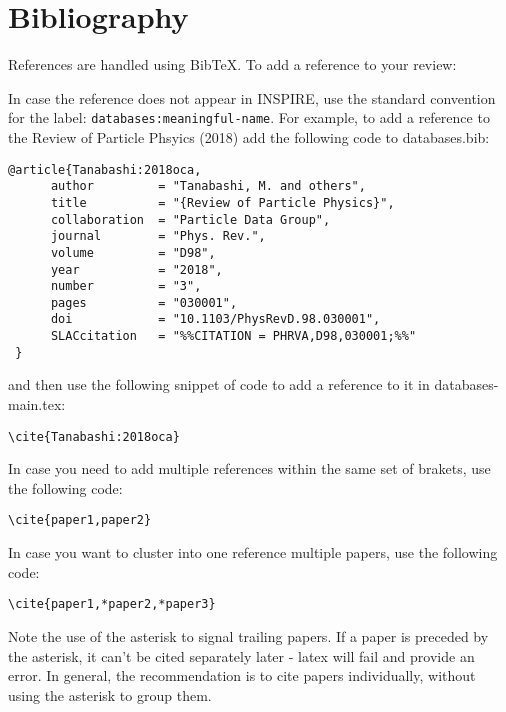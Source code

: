 \section{Bibliography}

References are handled using BibTeX. To add a reference to your review:
In case the reference does not appear in INSPIRE, use the standard convention for the label: {\tt databases:meaningful-name}.
For example, to add a reference to the Review of Particle Phsyics (2018) 
add the following code to databases.bib:
\begin{verbatim}
@article{Tanabashi:2018oca,
      author         = "Tanabashi, M. and others",
      title          = "{Review of Particle Physics}",
      collaboration  = "Particle Data Group",
      journal        = "Phys. Rev.",
      volume         = "D98",
      year           = "2018",
      number         = "3",
      pages          = "030001",
      doi            = "10.1103/PhysRevD.98.030001",
      SLACcitation   = "%%CITATION = PHRVA,D98,030001;%%"
 }
\end{verbatim}
and then use the following snippet of code to add a reference to it in databases-main.tex:
\begin{verbatim}
\cite{Tanabashi:2018oca}
\end{verbatim}
In case you need to add multiple references within the same set of brakets, use the following code:
\begin{verbatim}
\cite{paper1,paper2}
\end{verbatim}
In case you want to cluster into one reference multiple papers, use the following code:
\begin{verbatim}
\cite{paper1,*paper2,*paper3}
\end{verbatim}
Note the use of the asterisk to signal trailing papers. 
If a paper is preceded by the asterisk, it can't be cited separately later - latex will fail and provide an error.
In general, the recommendation is to cite papers individually, without using the asterisk to group them.



